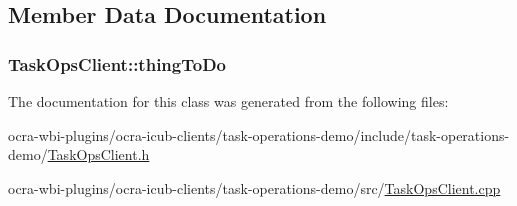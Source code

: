 \subsection{\-Member \-Data \-Documentation}
\hypertarget{classTaskOpsClient_a3409c4ef6b396943397b5bd9237f0a40}{
\subsubsection[{thing\-To\-Do}]{ {\bf \-Task\-Ops\-Client\-::thing\-To\-Do}}}\label{classTaskOpsClient_a3409c4ef6b396943397b5bd9237f0a40}


\-The documentation for this class was generated from the following files\-:\begin{DoxyCompactItemize}
\item 
ocra-\/wbi-\/plugins/ocra-\/icub-\/clients/task-\/operations-\/demo/include/task-\/operations-\/demo/\hyperlink{TaskOpsClient_8h}{\-Task\-Ops\-Client.\-h}\item 
ocra-\/wbi-\/plugins/ocra-\/icub-\/clients/task-\/operations-\/demo/src/\hyperlink{TaskOpsClient_8cpp}{\-Task\-Ops\-Client.\-cpp}\end{DoxyCompactItemize}

